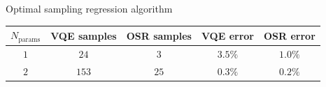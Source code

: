 \documentclass[9pt, handout, aspectratio=169]{beamer}	%
\begin{document}
\begin{frame}[allowframebreaks]{Optimal sampling regression algorithm}
\vspace{-1em}

\begin{table}[!bp]
	\centering
	\begin{tabular}{ c c c c c }
		\hline
		$N_\text{params}$ & VQE samples & OSR samples &
		VQE error & OSR error \\
		\hline
		\hline
		$1$ & $24$ & $3$ & $3.5\%$ & $1.0\%$ \\
		\hline
		$2$ & $153$ & $25$ & $0.3\%$ & $0.2\%$ \\
		\hline
	\end{tabular}
\end{table}

\end{frame}

\end{document}
